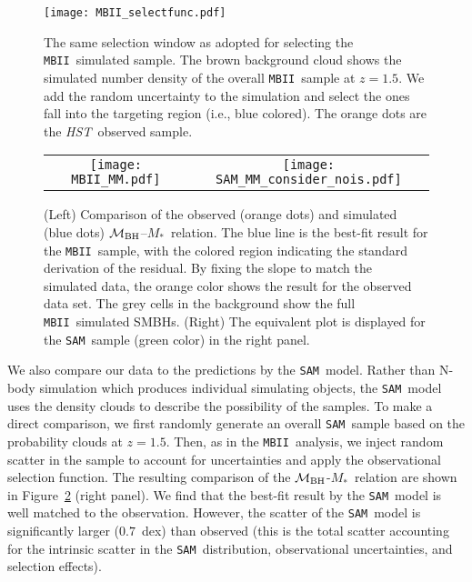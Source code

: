 \documentclass{natureprintstyle}
\newcommand{\hst}{{\it HST}}
\newcommand{\mbh}{$\mathcal M_{\rm BH}$}
\newcommand{\mstar}{{$M_*$}}
\newcommand{\sam}{\texttt{SAM}}
\newcommand{\mbii}{\texttt{MBII}}
\newcommand{\ding}[1]{\textcolor{red}{[{\bf Xuheng}: #1]}}
\begin{document}
\begin{figure}[t]
\texttt{[image: MBII\_selectfunc.pdf]}
\caption{The same selection window as adopted for selecting the \mbii\ simulated sample. The brown background cloud shows the simulated number density of the overall \mbii\ sample at $z=1.5$. We add the random uncertainty to the simulation and select the ones fall into the targeting region (i.e., blue colored). The orange dots are the \hst\ observed sample.}
\label{fig:selectfunc}
\end{figure}

\begin{figure*}[t]%
\begin{tabular}{c c}
\texttt{[image: MBII\_MM.pdf]} &
\texttt{[image: SAM\_MM\_consider\_nois.pdf]} \\
\end{tabular}
\caption{(Left) Comparison of the observed (orange dots) and simulated (blue dots) \mbh--\mstar\ relation. The blue line is the best-fit result for the \mbii\ sample, with the colored region indicating the standard derivation of the residual. By fixing the slope to match the simulated data, the orange color shows the result for the observed data set. The grey cells in the background show the full \mbii\ simulated SMBHs. (Right) The equivalent plot is displayed for the \sam\ sample (green color) in the right panel.}
\label{fig:MM_comp}
\end{figure*}

We also compare our data to the predictions by the \sam\ model. Rather than N-body simulation which produces individual simulating objects, the \sam\ model uses the density clouds to describe the possibility of the samples. 
To make a direct comparison, we first randomly generate an overall \sam\ sample based on the probability clouds at $z=1.5$. Then, as in the \mbii\ analysis, we inject random scatter in the sample to account for uncertainties and apply the observational selection function. The resulting comparison of the  \mbh-\mstar\ relation are shown in Figure~\ref{fig:MM_comp} (right panel). We find that the best-fit result by the \sam\ model is well matched to the observation. However, the scatter of the \sam\ model is significantly larger ($0.7$~dex) than observed (this is the total scatter accounting for the intrinsic scatter in the \sam\ distribution, observational uncertainties, and selection effects).  
\end{document}
